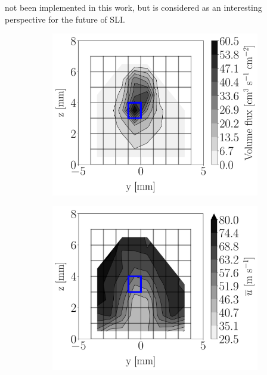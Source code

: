 not been implemented in this work, but is considered as an interesting perspective for the future of SLI.


\begin{figure}[h!]
\centering
\begin{subfigure}[b]{0.3\textwidth}
	\centering
   \includegraphics[scale=0.225]{./part2_developments/figures_ch5_resolved_JICF/injectors_SLI_extra/uG100_dx10_x05_volume_flux_map}
\end{subfigure}
   \hspace{0.17in}
\begin{subfigure}[b]{0.3\textwidth}
	\centering
   \includegraphics[scale=0.225]{./part2_developments/figures_ch5_resolved_JICF/injectors_SLI_extra/uG100_dx10_x05_ux_mean_map}

\end{subfigure}
\end{figure}
